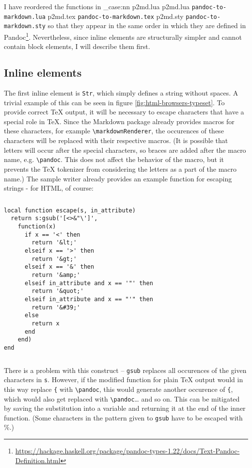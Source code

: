 \documentclass[
  digital,     %
  oneside,     %
  nosansbold,  %
  nocolorbold, %
  lof,         %
  lot,         %
]{fithesis4}
\newcommand\macro[1]{\texttt{\textbackslash{}{#1}}}
\newcommand\pandoc[1]{\macro{pandoc\-{#1}}}
\newcommand\renderer[1]{\macro{markdown\-Renderer\-{#1}}}
\newcommand\file[1]
  {
    \str_case:nn
      { #1 }
      {
        { p2md.lua } { \texttt{pandoc\hyp{}to\hyp{}markdown.lua} }
        { p2md.tex } { \texttt{pandoc\hyp{}to\hyp{}markdown.tex} }
        { p2md.sty } { \texttt{pandoc\hyp{}to\hyp{}markdown.sty} }
      }
  }
\begin{document}
I have reordered the functions in \file{p2md.lua} so that they appear in the same order in which they are defined in Pandoc\footnote{\url{https://hackage.haskell.org/package/pandoc-types-1.22/docs/Text-Pandoc-Definition.html}}. Nevertheless, since inline elements are structurally simpler and cannot contain block elements, I will describe them first.

\subsection{Inline elements}

The first inline element is \texttt{Str}, which simply defines a string without spaces. A trivial example of this can be seen in figure \ref{fig:html-browsers-typeset}. To provide correct \TeX{} output, it will be necessary to escape characters that have a special role in \TeX{}. Since the Markdown package already provides macros for these characters, for example \renderer{Backslash}, the occurences of these characters will be replaced with their respective macros. (It is possible that letters will occur after the special characters, so braces are added after the macro name, e.g. \pandoc{Backslash\{\}}. This does not affect the behavior of the macro, but it prevents the \TeX{} tokenizer from considering the letters as a part of the macro name.) The sample writer already provides an example function for escaping strings - for HTML, of course:

$ $

\noindent
\lstset{language=[5.3]Lua}
\begin{lstlisting}
local function escape(s, in_attribute)
  return s:gsub('[<>&"\']',
    function(x)
      if x == '<' then
        return '&lt;'
      elseif x == '>' then
        return '&gt;'
      elseif x == '&' then
        return '&amp;'
      elseif in_attribute and x == '"' then
        return '&quot;'
      elseif in_attribute and x == "'" then
        return '&#39;'
      else
        return x
      end
    end)
end
\end{lstlisting}

$ $

\noindent
There is a problem with this construct -- \texttt{gsub} replaces all occurences of the given characters in \texttt{s}. However, if the modified function for plain \TeX{} output would in this way replace \texttt{\{} with \pandoc{LeftBrace\{\}}, this would generate another occurence of \texttt{\{}, which would also get replaced with \pandoc{LeftBrace\{\}}\dots{} and so on. This can be mitigated by saving the substitution into a variable and returning it at the end of the inner function. (Some characters in the pattern given to \texttt{gsub} have to be escaped with \%.)
\end{document}
